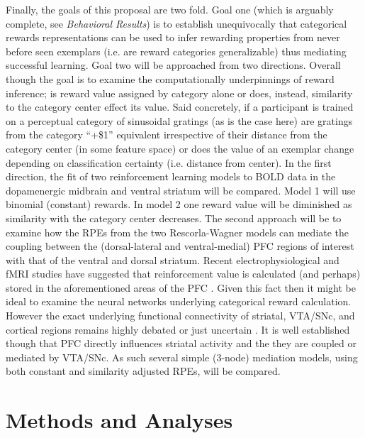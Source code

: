 \documentclass[doc,12pt]{apa}        %
\begin{document}
Finally, the goals of this proposal are two fold.  Goal one (which is arguably complete, see \emph{Behavioral Results}) is to establish unequivocally that categorical rewards representations can be used to infer rewarding properties from never before seen exemplars (i.e. are reward categories generalizable) thus mediating successful learning.  Goal two will be approached from two directions.  Overall though the goal is to examine the computationally underpinnings of reward inference; is reward value assigned by category alone or does, instead, similarity to the category center effect its value. Said concretely, if a participant is trained on a perceptual category of sinusoidal gratings (as is the case here) are gratings from the category ``+\$1'' equivalent irrespective of their distance from the category center (in some feature space)  or does the value of an exemplar change depending on classification certainty (i.e. distance from center).  In the first direction, the fit of two reinforcement learning models to BOLD data in the dopamenergic midbrain and ventral striatum will be compared.  Model 1 will use binomial (constant) rewards. In model 2 one reward value will be diminished as similarity with the category center decreases.  The second approach will be to examine how the RPEs from the two Rescorla-Wagner models can mediate the coupling between the (dorsal-lateral and ventral-medial) PFC regions of interest with that of the ventral and dorsal striatum.  Recent electrophysiological and fMRI studies have suggested that reinforcement value is calculated (and perhaps) stored in the aforementioned areas of the PFC \cite{Daw:2011p7995,Bornstein:2011p7996,Frank:2011p8152,OReilly:2010p7612,OReilly:2006p1161,OReilly:2006p2615}.  Given this fact then it might be ideal to examine the neural networks underlying categorical reward calculation. However the exact underlying functional connectivity of striatal, VTA/SNc, and cortical regions remains highly debated or just uncertain \cite{Daw:2011p7995,Bornstein:2011p7996,Frank:2011p8152}.  It is well established though that PFC directly influences striatal activity and the they are coupled or mediated by VTA/SNc.   As such several simple (3-node) mediation models, using both constant and similarity adjusted RPEs, will be compared.

\section{Methods and Analyses} %
\label{sec:methods}
\end{document}
